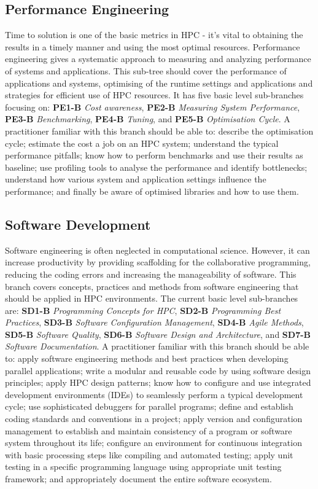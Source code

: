 \documentclass[jocse]{jocseart}
\begin{document}
\subsection{Performance Engineering}

Time to solution is one of the basic metrics in HPC - it’s vital to obtaining the results in a timely manner and using the most optimal resources. Performance engineering gives a systematic approach to measuring and analyzing performance of systems and applications. This sub-tree should cover the performance of applications and systems, optimising of the runtime settings and applications and strategies for efficient use of HPC resources. It has five basic level sub-branches focusing on: \textbf{PE1-B} \textit{Cost awareness}, \textbf{PE2-B} \textit{Measuring System Performance}, \textbf{PE3-B} \textit{Benchmarking}, \textbf{PE4-B} \textit{Tuning}, and \textbf{PE5-B} \textit{Optimisation Cycle}. 
A practitioner familiar with this branch should be able to: describe the optimisation cycle; estimate the cost a job on an HPC system; understand the typical performance pitfalls; know how to perform benchmarks and use their results as baseline; use profiling tools to analyse the performance and identify bottlenecks; understand how various system and application settings influence the performance; and finally be aware of optimised libraries and how to use them. 

\subsection{Software Development}

Software engineering is often neglected in computational science. However, it can increase productivity by providing scaffolding for the collaborative programming, reducing the coding errors and increasing the manageability of software. This branch covers concepts, practices and methods from software engineering that should be applied in HPC environments. The current basic level sub-branches are: \textbf{SD1-B} \textit{Programming Concepts for HPC}, \textbf{SD2-B} \textit{Programming Best Practices}, \textbf{SD3-B} \textit{Software Configuration Management}, \textbf{SD4-B} \textit{Agile Methods}, \textbf{SD5-B} \textit{Software Quality}, \textbf{SD6-B} \textit{Software Design and Architecture}, and \textbf{SD7-B} \textit{Software Documentation}. A practitioner familiar with this branch should be able to: apply software engineering methods and best practices when developing parallel applications;  write a modular and reusable code by using software design principles; apply HPC design patterns; know how to configure and use integrated development environments (IDEs) to seamlessly perform a typical development cycle; use sophisticated debuggers for parallel programs; define and establish coding standards and conventions in a project; apply version and configuration management to establish and maintain consistency of a program or software system throughout its life; configure an environment for continuous integration with basic processing steps like compiling and automated testing; apply unit testing in a specific programming language using appropriate unit testing framework; and appropriately document the entire software ecosystem. 
\end{document}
